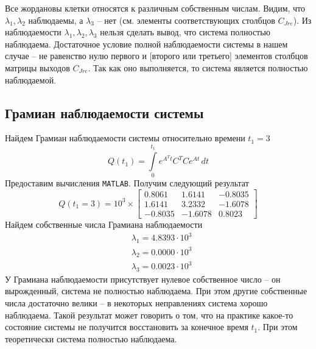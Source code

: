 \documentclass[a4paper, 12pt]{article}
\begin{document}
    Все жордановы клетки относятся к различным собственным числам. Видим, что $\lambda_{1},\lambda_{2}$ наблюдаемы, а
    $\lambda_3$ -- нет (см. элементы соответствующих столбцов $C_{Jre}$). Из наблюдаемости $\lambda_1,\lambda_2,\lambda_3$ нельзя сделать вывод, что система полностью наблюдаема. Достаточное условие полной наблюдаемости системы
    в нашем случае -- не равенство нулю первого и [второго или третьего] элементов столбцов матрицы выходов $C_{Jre}$. Так как
    оно выполняется, то система является полностью наблюдаемой.


    \subsection{Грамиан наблюдаемости системы}
    Найдем Грамиан наблюдаемости системы относительно времени $t_1=3$
    $$Q(t_1)=\int\limits_{0}^{t_1}e^{A^Tt}C^TCe^{At}\,dt$$
    Предоставим вычисления \texttt{MATLAB}. Получим следующий результат
    $$
    Q(t_1=3)=10^3\times\begin{bmatrix}
    0.8061    &1.6141   &-0.8035\\
    1.6141    &3.2332   &-1.6078\\
   -0.8035   &-1.6078    &0.8023
    \end{bmatrix}
    $$
    Найдем собственные числа Грамиана наблюдаемости
    \begin{align*}
    &\lambda_1=4.8393\cdot 10^3\\
    &\lambda_2=0.0000\cdot 10^3\\
    &\lambda_3=0.0023\cdot 10^3
    \end{align*}
    У Грамиана наблюдаемости присутствует нулевое собственное число -- он вырожденный, система не полностью наблюдаема.
    При этом другие собственные числа достаточно велики -- в некоторых неправлениях система хорошо наблюдаема. Такой результат
    может говорить о том, что на практике какое-то состояние системы не получится восстановить за конечное время $t_1$. При
    этом теоретически система полностью наблюдаема.
\end{document}
